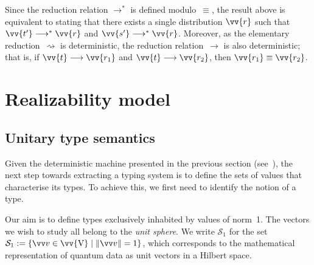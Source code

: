 \documentclass[runningheads,orivec,envcountsame,envcountsect]{llncs}
\providecommand{\qed}{\hbox{\rule{1ex}{1ex}}}%
\newcommand\s[1]{\ensuremath{\mathsf{#1}}}
\newcommand\Val{{\s V}}
\newcommand\lra{\longrightarrow}
\def\Val{\mathrm{V}}          %
\def\Sph{\mathcal{S}_1}       %
\def\lraneq{\rightsquigarrow}
\def\eval{\lra^*}
\begin{document}

\begin{remark}\label{rmk:determinism}
  Since the reduction relation $\eval$ is defined modulo~$\equiv$, the result
  above is equivalent to stating that there exists a single distribution
  $\vv{r}$ such that $\vv{t'}\eval\vv{r}$ and $\vv{s'}\eval\vv{r}$.
  Moreover, as the elementary reduction~$\lraneq$ is deterministic, the
  reduction relation~$\lra$ is also deterministic; that is, if
  $\vv{t}\lra\vv{r_1}$ and $\vv{t}\lra\vv{r_2}$, then
  $\vv{r_1}\equiv\vv{r_2}$.
\end{remark}


\section{Realizability model}\label{sec:model}

\subsection{Unitary type semantics}
Given the deterministic machine presented in the previous section
(see~), the next
step towards extracting a typing system is to define the sets of values that
characterise its types. To achieve this, we first need to identify the notion
of a type.

Our aim is to define types exclusively inhabited by values of norm~1. The
vectors we wish to study all belong to the \emph{unit sphere}. We write $\Sph$
for the set $\Sph := \{\vv v \in \vv{\Val} \mid \|\vv v\| = 1\}$, which
corresponds to the mathematical representation of quantum data as unit vectors
in a Hilbert space.
\end{document}
